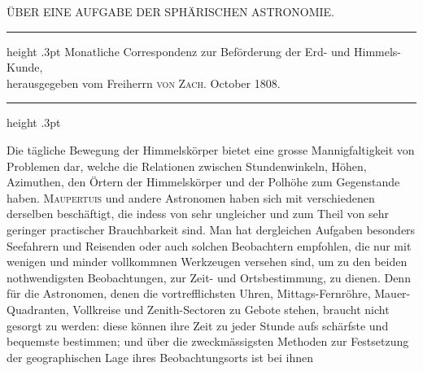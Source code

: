 \par\clearpage
{}
\begingroup
\pagestyle{empty}
\newcommand{\GaussVIGathering}[2]{%
  \fancypagestyle{gaussVIGathering}{%
    \fancyhf{}%
    \renewcommand{\headrulewidth}{0pt}%
    \renewcommand{\footrulewidth}{0pt}%
    \fancyfoot[C]{\makebox[\textwidth][l]{%
      \hspace*{.025\textwidth}{\footnotesize\bfseries #1}\hfill
      {\normalsize\bfseries\textls[90]{#2}}\hspace*{.18\textwidth}}}%
  }%
  \thispagestyle{gaussVIGathering}%
}
\thispagestyle{empty}
%
\vspace*{.24\textheight}
\begin{center}
ÜBER EINE AUFGABE DER SPHÄRISCHEN ASTRONOMIE.
\end{center}
\begin{center}
\parbox{.78\linewidth}{%
  \centering\fontsize{8}{10}\selectfont\frenchspacing
  \hrule height .3pt\relax\vspace{3pt}
  Monatliche Correspondenz zur Beförderung der Erd- und Himmels-Kunde,\\
  herausgegeben vom Freiherrn \textsc{von Zach}. October 1808.\par
  \vspace{3pt}\hrule height .3pt\relax
}
\end{center}
\par\indent Die tägliche Bewegung der Himmelskörper bietet eine grosse Mannigfaltigkeit
von Problemen dar, welche die Relationen zwischen Stundenwinkeln,
Höhen, Azimuthen, den Örtern der Himmelskörper und der Polhöhe zum Gegenstande
haben. \textsc{Maupertuis} und andere Astronomen haben sich mit verschiedenen
derselben beschäftigt, die indess von sehr ungleicher und zum Theil von
sehr geringer practischer Brauchbarkeit sind. Man hat dergleichen Aufgaben
besonders Seefahrern und Reisenden oder auch solchen Beobachtern empfohlen,
die nur mit wenigen und minder vollkommnen Werkzeugen versehen sind, um
zu den beiden nothwendigsten Beobachtungen, zur Zeit- und Ortsbestimmung,
zu dienen. Denn für die Astronomen, denen die vortrefflichsten Uhren, Mittags-Fernröhre,
Mauer-Quadranten, Vollkreise und Zenith-Sectoren zu Gebote stehen,
braucht nicht gesorgt zu werden: diese können ihre Zeit zu jeder Stunde
aufs schärfste und bequemste bestimmen; und über die zweckmässigsten Methoden
zur Festsetzung der geographischen Lage ihres Beobachtungsorts ist bei ihnen
